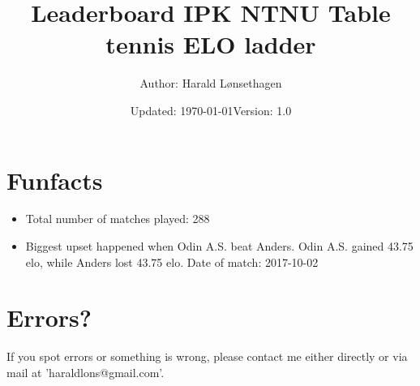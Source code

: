 \documentclass[11pt]{article}
\newcommand\tab[1][1cm]{\hspace*{#1}}
\begin{document}
\title{\textbf{Leaderboard IPK NTNU Table tennis ELO ladder }}
\author{Author: Harald Lønsethagen}
\date{Updated: \today\tab Version: 1.0}

\maketitle
 

\makeatletter


\section*{Funfacts}
\begin{itemize}
    \item Total number of matches played: 288
    \item Biggest upset happened when Odin A.S. beat Anders. Odin A.S. gained 43.75 elo, while Anders lost 43.75 elo. Date of match: 2017-10-02
\end{itemize}
\section*{Errors?}
If you spot errors or something is wrong, please contact me either directly or via mail at 'haraldlons@gmail.com'.
\end{document}
